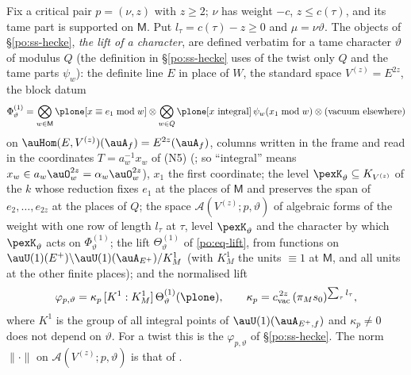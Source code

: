 \documentclass[10pt]{amsart}
\theoremstyle{definition}
\theoremstyle{remark}
\begin{document}
Fix a critical pair $p=(\nu,z)$ with $z\ge2$; $\nu$ has weight $-c$, $z\le c(\tau)$, and its tame
part is supported on $\mathsf M$. Put $l_\tau=c(\tau)-z\ge0$ and $\mu=\nu\vartheta$. The objects
of \S\ref{po:ss-hecke}, \emph{the lift of a character}, are defined verbatim for a tame character
$\vartheta$ of modulus $Q$ (the definition in \S\ref{po:ss-hecke} uses of the twist only $Q$ and the
tame parts $\psi_w$): the definite line $E$ in place of $W$, the standard space $V^{(z)}=E^{2z}$, the
block datum
\[
\Phi^{(1)}_{\vartheta}=\bigotimes_{w\in\mathsf M}\plone[x\equiv e_1\bmod w]\otimes
\bigotimes_{w\in Q}\plone[x\text{ integral}]\,\psi_w(x_1\bmod w)\otimes(\text{vacuum elsewhere})
\]
on $\auHom(E,V^{(z)})(\auA_f)=E^{2z}(\auA_f)$, columns written in the frame and read in the
coordinates $T=a_w^{-1}x_w$ of (N5) ({\cite[Lemma~6.32]{P53}}; so ``integral'' means $x_w\in a_w\auO_w^{2z}=\alpha_w\auO_w^{2z}$), $x_1$ the first
coordinate; the level $\pexK_\vartheta\subseteq K_{V^{(z)}}$ of the $k$ whose reduction fixes $e_1$
at the places of $\mathsf M$ and preserves the span of $e_2,\dots,e_{2z}$ at the places of $Q$; the
space $\mathcal A(V^{(z)};p,\vartheta)$ of algebraic forms of the weight with one row of length
$l_\tau$ at $\tau$, level $\pexK_\vartheta$ and the character by which $\pexK_\vartheta$ acts on
$\Phi^{(1)}_\vartheta$; the lift $\Theta^{(1)}_\vartheta$ of \eqref{po:eq-lift}, from functions on
$\auU(1)(E^+)\backslash\auU(1)(\auA_{E^+})/K^1_M$ (with $K^1_M$ the units $\equiv1$ at
$\mathsf M$, and all units at the other finite places); and the normalised lift
\begin{equation}\label{pex:eq-phi}
\varphi_{p,\vartheta}=\kappa_p\,[K^1:K^1_M]\,\Theta^{(1)}_\vartheta(\plone),\qquad\kappa_p=
c_{\mathrm{vac}}^{\,2z}\,(\pi_Ms_0)^{\sum_\tau l_\tau},
\end{equation}
where $K^1$ is the group of all integral points of $\auU(1)(\auA_{E^+,f})$ and $\kappa_p\ne0$ does not
depend on $\vartheta$. For a twist this is the $\varphi_{p,\vartheta}$ of \S\ref{po:ss-hecke}. The
norm $\|\cdot\|$ on $\mathcal A(V^{(z)};p,\vartheta)$ is that of {\cite[\S14.3]{P46}}.
\end{document}

